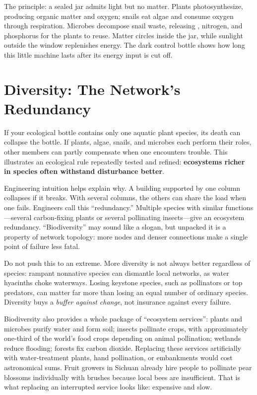 \begin{shiyan}
The principle: a sealed jar admits light but no matter. Plants photosynthesize, producing organic matter and oxygen; snails eat algae and consume oxygen through respiration. Microbes decompose snail waste, releasing , nitrogen, and phosphorus for the plants to reuse. Matter circles inside the jar, while sunlight outside the window replenishes energy. The dark control bottle shows how long this little machine lasts after its energy input is cut off.
\end{shiyan}

\section{Diversity: The Network's Redundancy}

If your ecological bottle contains only one aquatic plant species, its death can collapse the bottle. If plants, algae, snails, and microbes each perform their roles, other members can partly compensate when one encounters trouble. This illustrates an ecological rule repeatedly tested and refined: \textbf{ecosystems richer in species often withstand disturbance better}.

Engineering intuition helps explain why. A building supported by one column collapses if it breaks. With several columns, the others can share the load when one fails. Engineers call this ``redundancy.'' Multiple species with similar functions---several carbon-fixing plants or several pollinating insects---give an ecosystem redundancy. ``Biodiversity'' may sound like a slogan, but unpacked it is a property of network topology: more nodes and denser connections make a single point of failure less fatal.

Do not push this to an extreme. More diversity is not always better regardless of species: rampant nonnative species can dismantle local networks, as water hyacinths choke waterways. Losing keystone species, such as pollinators or top predators, can matter far more than losing an equal number of ordinary species. Diversity buys a \emph{buffer against change}, not insurance against every failure.

Biodiversity also provides a whole package of ``ecosystem services'': plants and microbes purify water and form soil; insects pollinate crops, with approximately one-third of the world's food crops depending on animal pollination; wetlands reduce flooding; forests fix carbon dioxide. Replacing these services artificially with water-treatment plants, hand pollination, or embankments would cost astronomical sums. Fruit growers in Sichuan already hire people to pollinate pear blossoms individually with brushes because local bees are insufficient. That is what replacing an interrupted service looks like: expensive and slow.

